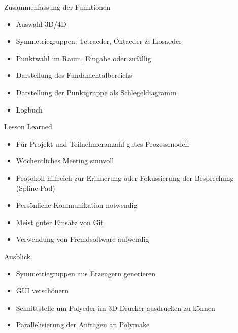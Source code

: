 \documentclass[ucs,11pt]{beamer}
\begin{document}
\begin{frame}{Zusammenfassung der Funktionen}
	\begin{itemize}
		\item Auswahl 3D/4D \pause
		\item Symmetriegruppen: Tetraeder, Oktaeder \& Ikosaeder \pause
		\item Punktwahl im Raum, Eingabe oder zufällig \pause
		\item Darstellung des Fundamentalbereichs \pause
		\item Darstellung der Punktgruppe als Schlegeldiagramm \pause
		\item Logbuch 	
	\end{itemize}
\end{frame}

\begin{frame}{Lesson Learned}
	\begin{itemize}
		\item Für Projekt und Teilnehmeranzahl gutes Prozessmodell \pause
		\item Wöchentliches Meeting sinnvoll \pause
		\item Protokoll hilfreich zur Erinnerung oder Fokussierung der Besprechung (Spline-Pad) \pause
		\item Persönliche Kommunikation notwendig \pause
		\item Meist guter Einsatz von Git \pause
		\item Verwendung von Fremdsoftware aufwendig \pause
	\end{itemize}
\end{frame}

\begin{frame}{Ausblick}
\begin{itemize}
	\item Symmetriegruppen aus Erzeugern generieren
	\item GUI verschönern
	\item Schnittstelle um Polyeder im 3D-Drucker ausdrucken zu können
	\item Parallelisierung der Anfragen an Polymake
\end{itemize}
\end{frame}
\end{document}
